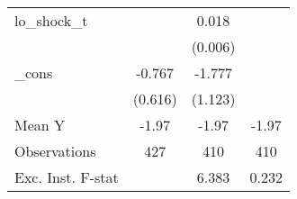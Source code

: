 {\begin{tabular}{l*{3}{c}}
\addlinespace
lo\_shock\_t  &                     &       0.018\sym{***}&                     \\
            &                     &     (0.006)         &                     \\
\addlinespace
\_cons      &      -0.767         &      -1.777         &                     \\
            &     (0.616)         &     (1.123)         &                     \\
\midrule
Mean Y      &       -1.97         &       -1.97         &       -1.97         \\
Observations&         427         &         410         &         410         \\
Exc. Inst. F-stat&                     &       6.383         &       0.232         \\
\bottomrule
\end{tabular}
}
